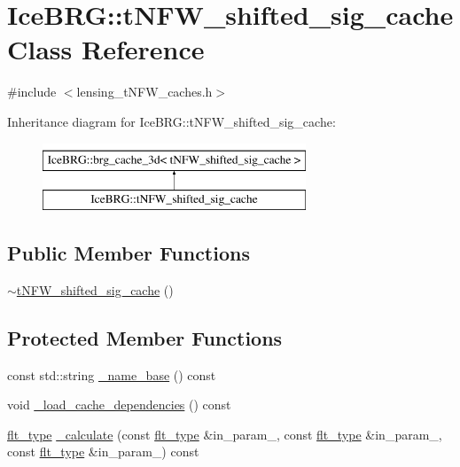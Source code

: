 \hypertarget{classIceBRG_1_1tNFW__shifted__sig__cache}{}\section{Ice\+B\+R\+G\+:\+:t\+N\+F\+W\+\_\+shifted\+\_\+sig\+\_\+cache Class Reference}
\label{classIceBRG_1_1tNFW__shifted__sig__cache}


{\ttfamily \#include $<$lensing\+\_\+t\+N\+F\+W\+\_\+caches.\+h$>$}

Inheritance diagram for Ice\+B\+R\+G\+:\+:t\+N\+F\+W\+\_\+shifted\+\_\+sig\+\_\+cache\+:\begin{figure}[H]
\begin{center}
\leavevmode
\includegraphics[height=2.000000cm]{classIceBRG_1_1tNFW__shifted__sig__cache}
\end{center}
\end{figure}
\subsection*{Public Member Functions}
\begin{DoxyCompactItemize}
\item 
\hyperlink{classIceBRG_1_1tNFW__shifted__sig__cache_a3a3b0f919c72a584189e238d7046c254}{$\sim$t\+N\+F\+W\+\_\+shifted\+\_\+sig\+\_\+cache} ()
\end{DoxyCompactItemize}
\subsection*{Protected Member Functions}
\begin{DoxyCompactItemize}
\item 
const std\+::string \hyperlink{classIceBRG_1_1tNFW__shifted__sig__cache_aab456822c86bf60e53dda313daa2ca26}{\+\_\+name\+\_\+base} () const 
\item 
void \hyperlink{classIceBRG_1_1tNFW__shifted__sig__cache_a27ef9eeccf76f1e7c79766ac3ee458b6}{\+\_\+load\+\_\+cache\+\_\+dependencies} () const 
\item 
\hyperlink{lib_2IceBRG__main_2common_8h_ad0f130a56eeb944d9ef2692ee881ecc4}{flt\+\_\+type} \hyperlink{classIceBRG_1_1tNFW__shifted__sig__cache_abe308d79507fc34f91e9ef27a5533a31}{\+\_\+calculate} (const \hyperlink{lib_2IceBRG__main_2common_8h_ad0f130a56eeb944d9ef2692ee881ecc4}{flt\+\_\+type} \&in\+\_\+param\+\_, const \hyperlink{lib_2IceBRG__main_2common_8h_ad0f130a56eeb944d9ef2692ee881ecc4}{flt\+\_\+type} \&in\+\_\+param\+\_, const \hyperlink{lib_2IceBRG__main_2common_8h_ad0f130a56eeb944d9ef2692ee881ecc4}{flt\+\_\+type} \&in\+\_\+param\+\_) const 
\end{DoxyCompactItemize}
